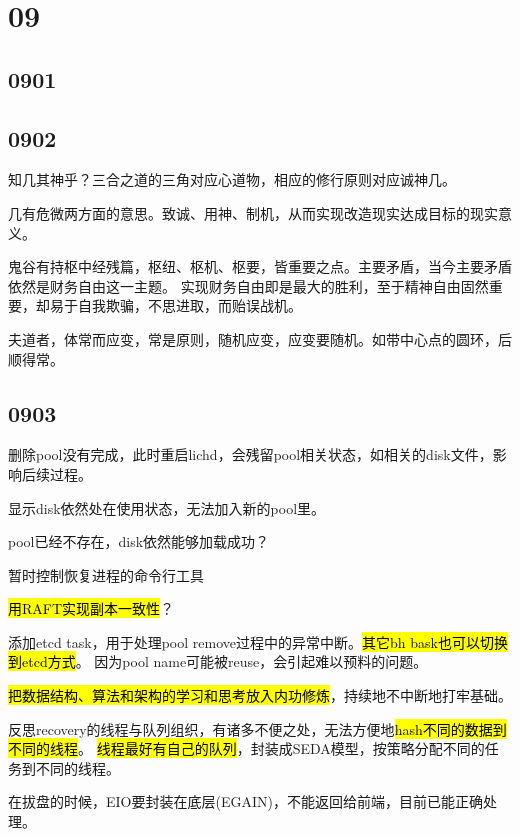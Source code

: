 \section{09}

\subsection{0901}

\subsection{0902}

知几其神乎？三合之道的三角对应心道物，相应的修行原则对应诚神几。

几有危微两方面的意思。致诚、用神、制机，从而实现改造现实达成目标的现实意义。

鬼谷有持枢中经残篇，枢纽、枢机、枢要，皆重要之点。主要矛盾，当今主要矛盾依然是财务自由这一主题。
实现财务自由即是最大的胜利，至于精神自由固然重要，却易于自我欺骗，不思进取，而贻误战机。

夫道者，体常而应变，常是原则，随机应变，应变要随机。如带中心点的圆环，后顺得常。

\subsection{0903}

删除pool没有完成，此时重启lichd，会残留pool相关状态，如相关的disk文件，影响后续过程。

\begin{enumbox}
\item 显示disk依然处在使用状态，无法加入新的pool里。
\item pool已经不存在，disk依然能够加载成功？
\item 暂时控制恢复进程的命令行工具
\item \hl{用RAFT实现副本一致性}？
\end{enumbox}

添加etcd task，用于处理pool remove过程中的异常中断。\hl{其它bh bask也可以切换到etcd方式}。
因为pool name可能被reuse，会引起难以预料的问题。

\hl{把数据结构、算法和架构的学习和思考放入内功修炼}，持续地不中断地打牢基础。

反思recovery的线程与队列组织，有诸多不便之处，无法方便地\hl{hash不同的数据到不同的线程}。
\hl{线程最好有自己的队列}，封装成SEDA模型，按策略分配不同的任务到不同的线程。

在拔盘的时候，EIO要封装在底层(EGAIN)，不能返回给前端，目前已能正确处理。

